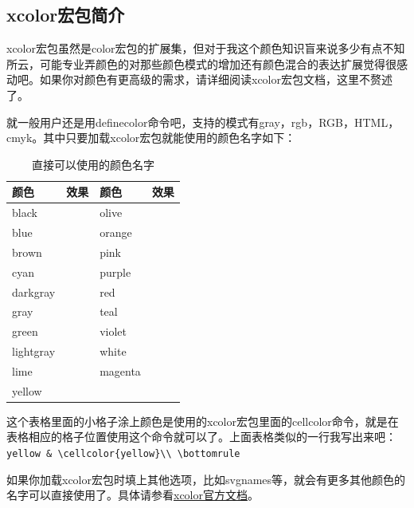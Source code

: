 \documentclass[12pt,oneside]{book}
\begin{document}
\begin{common-format}
\subsection{xcolor宏包简介}   
xcolor宏包虽然是color宏包的扩展集，但对于我这个颜色知识盲来说多少有点不知所云，可能专业弄颜色的对那些颜色模式的增加还有颜色混合的表达扩展觉得很感动吧。如果你对颜色有更高级的需求，请详细阅读xcolor宏包文档，这里不赘述了。

就一般用户还是用definecolor命令吧，支持的模式有gray，rgb，RGB，HTML，cmyk。其中只要加载xcolor宏包就能使用的颜色名字如下：
\begin{table}[H]
\centering
\begin{tabular}{@{}lp{50pt}lp{50pt}@{}}
\toprule
颜色        & 效果  & 颜色       & 效果\\ \midrule
black     &  \cellcolor{black}  & olive     &    \cellcolor{olive} \\
blue      &   \cellcolor{blue} & orange    &   \cellcolor{orange}\\
brown     &  \cellcolor{brown}  & pink      &   \cellcolor{pink}\\
cyan      &   \cellcolor{cyan} & purple    &   \cellcolor{purple}\\
darkgray  &  \cellcolor{darkgray} &red       &   \cellcolor{red}  \\
gray      &   \cellcolor{gray} & teal      &    \cellcolor{teal}\\
green     &   \cellcolor{green} & violet    &   \cellcolor{violet}\\
lightgray &  \cellcolor{lightgray} &white     &   \cellcolor{white} \\
lime      &    \cellcolor{lime} & magenta   &   \cellcolor{magenta} \\
yellow    &    \cellcolor{yellow}\\ \bottomrule
\end{tabular}
\label{tab:直接可以使用的颜色名字}
\caption{直接可以使用的颜色名字}
\end{table}
这个表格里面的小格子涂上颜色是使用的xcolor宏包里面的cellcolor命令，就是在表格相应的格子位置使用这个命令就可以了。上面表格类似的一行我写出来吧：\\
\verb+yellow & \cellcolor{yellow}\\ \bottomrule+

如果你加载xcolor宏包时填上其他选项，比如svgnames等，就会有更多其他颜色的名字可以直接使用了。具体请参看\href{http://mirrors.ctan.org/macros/latex/contrib/xcolor/xcolor.pdf}{xcolor官方文档}。



\end{common-format}
\end{document}
